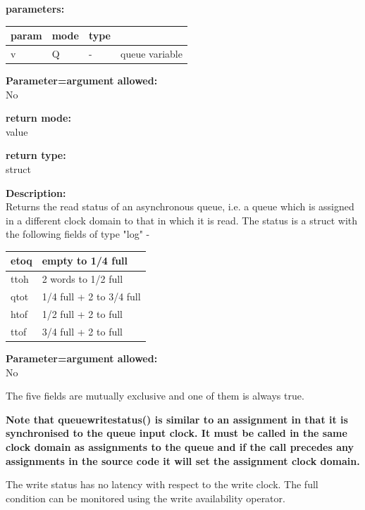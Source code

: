         {\bf parameters:} \\
        \begin{tabular}{| l | l | l | l |}
        \hline
        param  & mode & type & \\
        \hline \hline
        v & Q & - & queue variable \\ \hline
        \end{tabular}
        
        {\bf Parameter=argument allowed:} \\
        No
        
        {\bf return mode:} \\
        value

        {\bf return type:} \\
        struct
        
        {\bf Description:} \\
        Returns the read status of an asynchronous queue, i.e. a queue which
        is assigned in a different clock domain to that in which it is
        read. The status is a struct with the following fields of
        type "log" -

        \begin{tabular}{| l | l |}
        \hline
        etoq & empty to 1/4 full        \\ \hline
        ttoh & 2 words to 1/2 full      \\ \hline
        qtot & 1/4 full + 2 to 3/4 full \\ \hline
        htof & 1/2 full + 2 to full     \\ \hline 
        ttof & 3/4 full + 2 to full     \\ \hline  
        \end{tabular}

        {\bf Parameter=argument allowed:} \\
        No
        
        The five fields are mutually exclusive and one of them is always true.
        
        {\bf Note that queuewritestatus() is similar to an assignment in that it
        is synchronised to the queue input clock. It must be called in the same
        clock domain as assignments to the queue and if the call precedes any
        assignments in the source code it will set the assignment clock domain.}

        The write status has no latency with respect to the write clock. The
        full condition can be monitored using the write availability operator.
        
